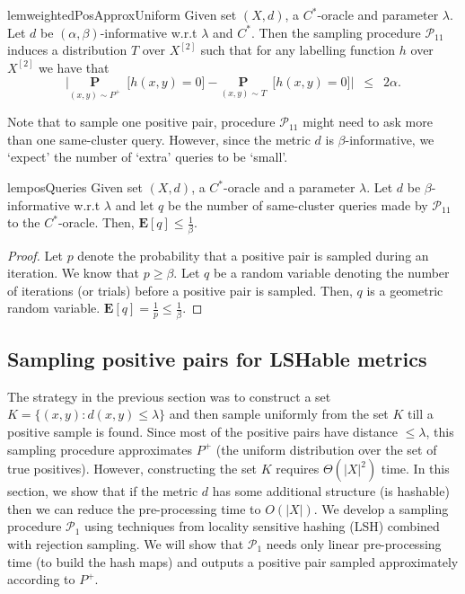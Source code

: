 \documentclass[12pt]{article}
\newcommand{\mb}{\mathbf}
\newcommand{\mc}{\mathcal}
\begin{document}
\begin{restatable}{lem}{weightedPosApproxUniform}
\label{lemma:weightedPosApproxUniform}
Given set $(X, d)$, a $C^*$-oracle and parameter $\lambda$. Let $d$ be $(\alpha, \beta)$-informative w.r.t $\lambda$ and $C^*$.  Then the sampling procedure $\mc P_{11}$ induces a distribution $T$ over $X^{[2]}$ such that for any labelling function $h$ over $X^{[2]}$ we have that $$\Big|\underset{(x, y) \sim P^+}{\mb P}\enspace \big[ h(x, y) = 0 ] - \underset{(x, y) \sim T}{\mb P}\enspace \big[ h(x, y) = 0 ]\Big|  \enspace \le \enspace 2\alpha.$$ 
\end{restatable}


\noindent Note that to sample one positive pair, procedure $\mc P_{11}$ might need to ask more than one same-cluster query. However, since the metric $d$ is $\beta$-informative, we `expect' the number of `extra' queries to be `small'. 

\begin{restatable}{lem}{posQueries}
\label{lemma:posQueries}
Given set $(X, d)$, a $C^*$-oracle and a parameter $\lambda$. Let $d$ be $\beta$-informative w.r.t $\lambda$ and let $q$ be the number of same-cluster queries made by $\mc P_{11}$ to the $C^*$-oracle. Then, $\mb E[q] \le \frac{1}{\beta}$.
\end{restatable}
\begin{proof}
Let $p$ denote the probability that a positive pair is sampled during an iteration. We know that $p \ge \beta$. Let $q$ be a random variable denoting the number of iterations (or trials) before a positive pair is sampled. Then, $q$ is a geometric random variable. $\mb E[q] = \frac{1}{p} \le \frac{1}{\beta}$.
\end{proof}

\subsection{Sampling positive pairs for LSHable metrics}
\label{section:samplingPositiveLSHable}

The strategy in the previous section was to construct a set $K = \{(x, y): d(x, y) \le \lambda\}$ and then sample uniformly from the set $K$ till a positive sample is found. Since most of the positive pairs have distance $\le \lambda$, this sampling procedure approximates $P^+$ (the uniform distribution over the set of true positives). However, constructing the set $K$ requires $\Theta(|X|^2)$ time. In this section, we show that if the metric $d$ has some additional structure (is hashable) then we can reduce the pre-processing time to $O(|X|)$. We develop a sampling procedure $\mc P_{1}$ using techniques from locality sensitive hashing (LSH) combined with rejection sampling. We will show that $\mc P_1$ needs only linear pre-processing time (to build the hash maps) and outputs a positive pair sampled approximately according to $P^+$.\\
\end{document}
